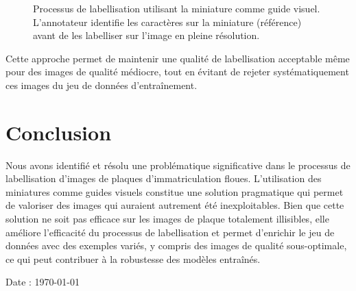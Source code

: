 \documentclass[twocolumn]{el-author}
\begin{document}
\begin{figure}[h]
\caption{Processus de labellisation utilisant la miniature comme guide visuel. L'annotateur identifie les caractères sur la miniature (référence) avant de les labelliser sur l'image en pleine résolution.}
\end{figure}

Cette approche permet de maintenir une qualité de labellisation acceptable même pour des images de qualité médiocre, tout en évitant de rejeter systématiquement ces images du jeu de données d'entraînement.

\section{Conclusion}

Nous avons identifié et résolu une problématique significative dans le processus de labellisation d'images de plaques d'immatriculation floues. L'utilisation des miniatures comme guides visuels constitue une solution pragmatique qui permet de valoriser des images qui auraient autrement été inexploitables. Bien que cette solution ne soit pas efficace sur les images de plaque totalement illisibles, elle améliore l'efficacité du processus de labellisation et permet d'enrichir le jeu de données avec des exemples variés, y compris des images de qualité sous-optimale, ce qui peut contribuer à la robustesse des modèles entraînés.


\vskip2pt



\noindent Date : \today
\end{document}
